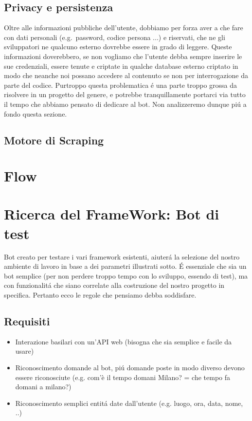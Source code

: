 \documentclass[]{article}
\begin{document}
\subsection{Privacy e persistenza}
Oltre alle informazioni pubbliche dell'utente, dobbiamo per forza aver a che fare con dati personali (e.g.\ password, codice persona ...) e riservati, che ne gli sviluppatori ne qualcuno esterno dovrebbe essere in grado di leggere. Queste informazioni doverebbero, se non vogliamo che l'utente debba sempre inserire le sue credenziali, essere tenute e criptate in qualche database esterno criptato in modo che neanche noi possano accedere al contenuto se non per interrogazione da parte del codice. Purtroppo questa problematica é una parte troppo grossa da risolvere in un progetto del genere, e potrebbe tranquillamente portarci via tutto il tempo che abbiamo pensato di dedicare al bot. Non analizzeremo dunque piú a fondo questa sezione. 

\subsection{Motore di Scraping}





\section{Flow}

\section{Ricerca del FrameWork: Bot di test}
Bot creato per testare i vari framework esistenti, aiuterá la selezione del nostro ambiente di lavoro in base a dei parametri illustrati sotto. É essenziale che sia un bot semplice (per non perdere troppo tempo con lo sviluppo, essendo di test), ma con funzionalitá che siano correlate alla costruzione del nostro progetto in specifica. Pertanto ecco le regole che pensiamo debba soddisfare.

\subsection{Requisiti}
\begin{itemize}
\item Interazione basilari con un’API web (bisogna che sia semplice e facile da usare)
\item Riconoscimento domande al bot, piú domande poste in modo diverso devono essere riconosciute (e.g. com'è il tempo domani Milano? = che tempo fa domani a milano?)
\item Riconoscimento semplici entitá date dall’utente (e.g. luogo, ora, data, nome, ..)
\end{itemize}
\end{document}
